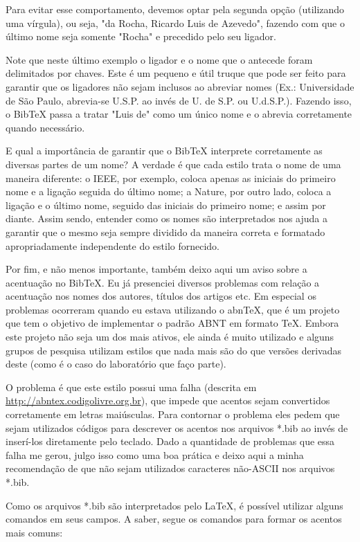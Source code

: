 \begin{anexosenv}
Para evitar esse comportamento, devemos optar pela segunda opção (utilizando uma vírgula), ou seja, "da Rocha, Ricardo {Luis de} Azevedo"{}, fazendo com que o último nome seja somente "Rocha"{} e precedido pelo seu ligador.

Note que neste último exemplo o ligador e o nome que o antecede foram delimitados por chaves. Este é um pequeno e útil truque que pode ser feito para garantir que os ligadores não sejam inclusos ao abreviar nomes (Ex.: Universidade de São Paulo, abrevia-se U.S.P. ao invés de U. de S.P. ou U.d.S.P.). Fazendo isso, o BibTeX passa a tratar "Luis de"{} como um único nome e o abrevia corretamente quando necessário.

E qual a importância de garantir que o BibTeX interprete corretamente as diversas partes de um nome? A verdade é que cada estilo trata o nome de uma maneira diferente: o IEEE, por exemplo, coloca apenas as iniciais do primeiro nome e a ligação seguida do último nome; a Nature, por outro lado, coloca a ligação e o último nome, seguido das iniciais do primeiro nome; e assim por diante. Assim sendo, entender como os nomes são interpretados nos ajuda a garantir que o mesmo seja sempre dividido da maneira correta e formatado apropriadamente independente do estilo fornecido.

Por fim, e não menos importante, também deixo aqui um aviso sobre a acentuação no BibTeX. Eu já presenciei diversos problemas com relação a acentuação nos nomes dos autores, títulos dos artigos etc. Em especial os problemas ocorreram quando eu estava utilizando o abnTeX, que é um projeto que tem o objetivo de implementar o padrão ABNT em formato TeX. Embora este projeto não seja um dos mais ativos, ele ainda é muito utilizado e alguns grupos de pesquisa utilizam estilos que nada mais são do que versões derivadas deste (como é o caso do laboratório que faço parte).

O problema é que este estilo possui uma falha (descrita em \href{http://abntex.codigolivre.org.br/node5.html}{http://abntex.codigolivre.org.br}), que impede que acentos sejam convertidos corretamente em letras maiúsculas. Para contornar o problema eles pedem que sejam utilizados códigos para descrever os acentos nos arquivos *.bib ao invés de inserí-los diretamente pelo teclado. Dado a quantidade de problemas que essa falha me gerou, julgo isso como uma boa prática e deixo aqui a minha recomendação de que não sejam utilizados caracteres não-ASCII nos arquivos *.bib.

Como os arquivos *.bib são interpretados pelo LaTeX, é possível utilizar alguns comandos em seus campos. A saber, segue os comandos para formar os acentos mais comuns:
\\
\\
\\




\end{anexosenv}
